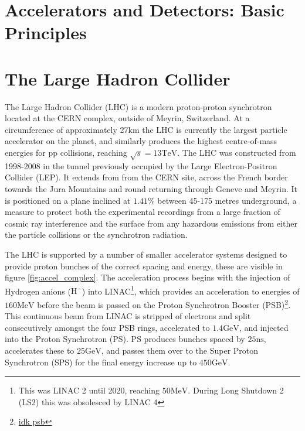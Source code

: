 
\section{Accelerators and Detectors: Basic Principles}


\section{The Large Hadron Collider}
The Large Hadron Collider (LHC) is a modern proton-proton synchrotron located at the CERN complex, outside of Meyrin, Switzerland. At a circumference of approximately 27km the LHC is currently the largest particle accelerator on the planet, and similarly produces the highest centre-of-mass energies for pp collisions, reaching $\sqrt{s}=13\text{TeV}$. The LHC was constructed from 1998-2008 in the tunnel previously occupied by the Large Electron-Positron Collider (LEP). It extends from from the CERN site, across the French border towards the Jura Mountains and round returning through Geneve and Meyrin. It is positioned on a plane inclined at $1.41\%$ between 45-175 metres underground, a measure to protect both the experimental recordings from a large fraction of cosmic ray interference and the surface from any hazardous emissions from either the particle collisions or the synchrotron radiation.

The LHC is supported by a number of smaller accelerator systems designed to provide proton bunches of the correct spacing and energy, these are visible in figure \ref{fig:accel_complex}. The acceleration process begins with the injection of Hydrogen anions ($\text{H}^{-}$) into LINAC\footnote{This was LINAC 2 until 2020, reaching $50\text{MeV}$. During Long Shutdown 2 (LS2) this was obsolesced by LINAC 4}, which provides an acceleration to energies of $160\text{MeV}$ before the beam is passed on the Proton Synchrotron Booster (PSB)\footnote{\href{https://cds.cern.ch/journal/CERNBulletin/2016/32/News\%20Articles/2201549?ln=en}{idk psb}}. This continuous beam from LINAC is stripped of electrons and split consecutively amongst the four PSB rings, accelerated to $1.4\text{GeV}$, and injected into the Proton Synchrotron (PS). PS produces bunches spaced by $25\text{ns}$, accelerates these to $25\text{GeV}$, and passes them over to the Super Proton Synchrotron (SPS) for the final energy increase up to $450\text{GeV}$.


